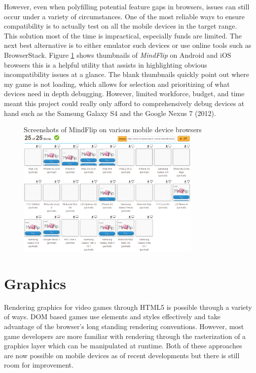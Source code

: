 \documentclass[final]{cmpreport}
\begin{document}
However, even when polyfilling potential feature gaps in browsers, issues can still occur under a variety of circumstances. One of the most reliable ways to ensure compatibility is to actually test on all the mobile devices in the target range. This solution most of the time is impractical, especially funds are limited. The next best alternative is to either emulator such devices or use online tools such as BrowserStack\footnotemark. Figure \ref{browserstack} shows thumbnails of \textit{MindFlip} on Android and iOS browsers this is a helpful utility that assists in highlighting obvious incompatibility issues at a glance. The blank thumbnails quickly point out where my game is not loading, which allows for selection and prioritizing of what devices need in depth debugging. However, limited workforce, budget, and time meant this project could really only afford to comprehensively debug devices at hand such as the Samsung Galaxy S4 and the Google Nexus 7 (2012).


\begin{figure}[h]{Screenshots of MindFlip on various mobile device browsers \label{browserstack}}
  \centering
    \includegraphics[width=0.8\textwidth]{browserstack.png}
\end{figure}

\clearpage
\section{Graphics}
Rendering graphics for video games through HTML5 is possible through a variety of ways. DOM based games use elements and styles effectively and take advantage of the browser's long standing rendering conventions. However, most game developers are more familiar with rendering through the rasterization of a graphics layer which can be manipulated at runtime. Both of these approaches are now possible on mobile devices as of recent developments but there is still room for improvement.
\end{document}

